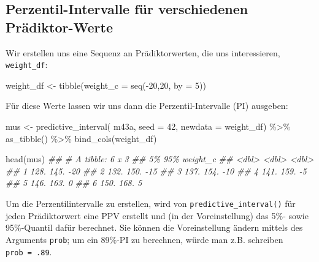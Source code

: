 \documentclass[
  a4paper,
  DIV=11]{scrreprt}
\newenvironment{Shaded}{\begin{snugshade}}{\end{snugshade}}
\newcommand{\AttributeTok}[1]{\textcolor[rgb]{0.40,0.45,0.13}{#1}}
\newcommand{\DecValTok}[1]{\textcolor[rgb]{0.68,0.00,0.00}{#1}}
\newcommand{\DocumentationTok}[1]{\textcolor[rgb]{0.37,0.37,0.37}{\textit{#1}}}
\newcommand{\FunctionTok}[1]{\textcolor[rgb]{0.28,0.35,0.67}{#1}}
\newcommand{\NormalTok}[1]{\textcolor[rgb]{0.00,0.23,0.31}{#1}}
\newcommand{\OtherTok}[1]{\textcolor[rgb]{0.00,0.23,0.31}{#1}}
\newcommand{\SpecialCharTok}[1]{\textcolor[rgb]{0.37,0.37,0.37}{#1}}
\theoremstyle{definition}
\theoremstyle{remark}
\begin{document}
\hypertarget{perzentil-intervalle-fuxfcr-verschiedenen-pruxe4diktor-werte}{%
\subsection{Perzentil-Intervalle für verschiedenen
Prädiktor-Werte}\label{perzentil-intervalle-fuxfcr-verschiedenen-pruxe4diktor-werte}}

Wir erstellen uns eine Sequenz an Prädiktorwerten, die uns
interessieren, \texttt{weight\_df}:

\begin{Shaded}
\begin{Highlighting}[]
\NormalTok{weight\_df }\OtherTok{\textless{}{-}} \FunctionTok{tibble}\NormalTok{(}\AttributeTok{weight\_c =} \FunctionTok{seq}\NormalTok{(}\SpecialCharTok{{-}}\DecValTok{20}\NormalTok{,}\DecValTok{20}\NormalTok{, }\AttributeTok{by =} \DecValTok{5}\NormalTok{))}
\end{Highlighting}
\end{Shaded}

Für diese Werte lassen wir uns dann die Perzentil-Intervalle (PI)
ausgeben:

\begin{Shaded}
\begin{Highlighting}[]
\NormalTok{mus }\OtherTok{\textless{}{-}} 
  \FunctionTok{predictive\_interval}\NormalTok{(}
\NormalTok{    m43a, }
    \AttributeTok{seed =} \DecValTok{42}\NormalTok{,}
    \AttributeTok{newdata =}\NormalTok{ weight\_df) }\SpecialCharTok{\%\textgreater{}\%} 
  \FunctionTok{as\_tibble}\NormalTok{() }\SpecialCharTok{\%\textgreater{}\%} 
  \FunctionTok{bind\_cols}\NormalTok{(weight\_df)}

\FunctionTok{head}\NormalTok{(mus)}
\DocumentationTok{\#\# \# A tibble: 6 x 3}
\DocumentationTok{\#\#    \textasciigrave{}5\%\textasciigrave{} \textasciigrave{}95\%\textasciigrave{} weight\_c}
\DocumentationTok{\#\#   \textless{}dbl\textgreater{} \textless{}dbl\textgreater{}    \textless{}dbl\textgreater{}}
\DocumentationTok{\#\# 1  128.  145.      {-}20}
\DocumentationTok{\#\# 2  132.  150.      {-}15}
\DocumentationTok{\#\# 3  137.  154.      {-}10}
\DocumentationTok{\#\# 4  141.  159.       {-}5}
\DocumentationTok{\#\# 5  146.  163.        0}
\DocumentationTok{\#\# 6  150.  168.        5}
\end{Highlighting}
\end{Shaded}

Um die Perzentilintervalle zu erstellen, wird von
\texttt{predictive\_interval()} für jeden Prädiktorwert eine PPV
erstellt und (in der Voreinstellung) das 5\%- sowie 95\%-Quantil dafür
berechnet. Sie können die Voreinstellung ändern mittels des Arguments
\texttt{prob}; um ein 89\%-PI zu berechnen, würde man z.B. schreiben
\texttt{prob\ =\ .89}.
\end{document}
